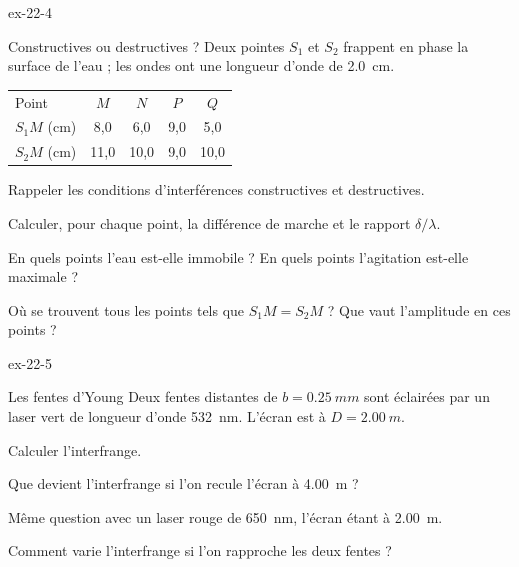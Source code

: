 \begin{blocLivre}{ex-22-4}
\begin{exercice}[1]{Constructives ou destructives ?}
Deux pointes $S_1$ et $S_2$ frappent en phase la surface de l'eau ; les ondes ont une longueur d'onde de \qty{2,0}{cm}.
\begin{center}
\begin{tabular}{lcccc}
\toprule
Point & $M$ & $N$ & $P$ & $Q$ \\
$S_1M$ (cm) & 8,0 & 6,0 & 9,0 & 5,0 \\
$S_2M$ (cm) & 11,0 & 10,0 & 9,0 & 10,0 \\
\bottomrule
\end{tabular}
\end{center}
\begin{questions}
\item Rappeler les conditions d'interférences constructives et destructives.
\item Calculer, pour chaque point, la différence de marche et le rapport $\delta/\lambda$.
\item En quels points l'eau est-elle immobile ? En quels points l'agitation est-elle maximale ?
\item Où se trouvent tous les points tels que $S_1M=S_2M$ ? Que vaut l'amplitude en ces points ?
\end{questions}
\end{exercice}
\end{blocLivre}
\begin{blocLivre}{ex-22-5}
\begin{exercice}[1]{Les fentes d'Young}
Deux fentes distantes de $b=\qty{0,25}{mm}$ sont éclairées par un laser vert de longueur d'onde \qty{532}{nm}. L'écran est à
$D=\qty{2,00}{m}$.
\begin{questions}
\item Calculer l'interfrange.
\item Que devient l'interfrange si l'on recule l'écran à \qty{4,00}{m} ?
\item Même question avec un laser rouge de \qty{650}{nm}, l'écran étant à \qty{2,00}{m}.
\item Comment varie l'interfrange si l'on rapproche les deux fentes ?
\end{questions}
\end{exercice}
\end{blocLivre}
